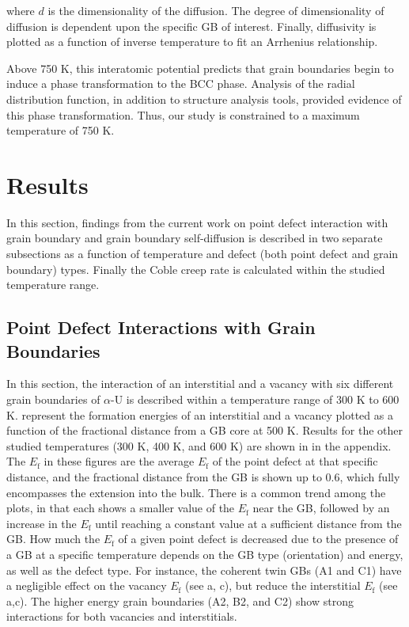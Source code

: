 \documentclass[review]{elsarticle}
\begin{document}
\noindent where $d$ is the dimensionality of the diffusion. The degree of dimensionality of diffusion is dependent upon the specific GB of interest. Finally, diffusivity is plotted as a function of inverse temperature to fit an Arrhenius relationship. 

Above 750 K, this interatomic potential predicts that grain boundaries begin to induce a phase transformation to the BCC phase. Analysis of the radial distribution function, in addition to structure analysis tools, provided evidence of this phase transformation. Thus, our study is constrained to a maximum temperature of 750 K. 


\FloatBarrier
\section{Results}

In this section, findings from the current work on point defect interaction with grain boundary and grain boundary self-diffusion is described in two separate subsections as a function of temperature and defect (both point defect and grain boundary) types. Finally the Coble creep rate is calculated within the studied temperature range.

\subsection{Point Defect Interactions with Grain Boundaries}

In this section, the interaction of an interstitial and a vacancy with six different grain boundaries of $\alpha$-U is described within a temperature range of 300 K to 600 K.  represent the formation energies of an interstitial and a vacancy plotted as a function of the fractional distance from a GB core at 500 K. Results for the other studied temperatures (300 K, 400 K, and 600 K) are shown in  in the appendix. The $E_{\mathrm{f}}$ in these figures are the average $E_{\mathrm{f}}$ of the point defect at that specific distance, and the fractional distance from the GB is shown up to 0.6, which fully encompasses the extension into the bulk. There is a common trend among the plots, in that each shows a smaller value of the $E_{\mathrm{f}}$ near the GB, followed by an increase in the $E_{\mathrm{f}}$ until reaching a constant value at a sufficient distance from the GB. How much the $E_{\mathrm{f}}$ of a given point defect is decreased due to the presence of a GB at a specific temperature depends on the GB type (orientation) and energy, as well as the defect type. For instance, the coherent twin GBs (A1 and C1) have a negligible effect on the vacancy $E_{\mathrm{f}}$ (see a, c), but reduce the interstitial $E_{\mathrm{f}}$ (see  a,c). The higher energy grain boundaries (A2, B2, and C2) show strong interactions for both vacancies and interstitials. 
\end{document}

